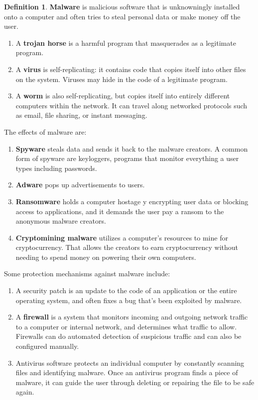 \documentclass[a4paper, 12pt]{report}
\theoremstyle{remark}
\theoremstyle{definition}
\newtheorem{definition}{Definition}[section]
\begin{document}
\begin{definition}
\textbf{Malware} is malicious software that is unknowningly installed onto a computer and often tries to steal personal data or make money off the user. 
\begin{enumerate}
    \item A \textbf{trojan horse} is a harmful program that masquerades as a legitimate program. 
    \item A \textbf{virus} is self-replicating: it contains code that copies itself into other files on the system. Viruses may hide in the code of a legitimate program. 
    \item A \textbf{worm} is also self-replicating, but copies itself into entirely different computers within the network. It can travel along networked protocols such as email, file sharing, or instant messaging. 
\end{enumerate}
The effects of malware are: 
\begin{enumerate}
    \item \textbf{Spyware} steals data and sends it back to the malware creators. A common form of spyware are keyloggers, programs that monitor everything a user types including passwords. 
    \item \textbf{Adware} pops up advertisements to users.
    \item \textbf{Ransomware} holds a computer hostage y encrypting user data or blocking access to applications, and it demands the user pay a ransom to the anonymous malware creators. 
    \item \textbf{Cryptomining malware} utilizes a computer's resources to mine for cryptocurrency. That allows the creators to earn cryptocurrency without needing to spend money on powering their own computers.
\end{enumerate}
\end{definition}

Some protection mechanisms against malware include: 
\begin{enumerate}
    \item A security patch is an update to the code of an application or the entire operating system, and often fixes a bug that's been exploited by malware. 
    \item A \textbf{firewall} is a system that monitors incoming and outgoing network traffic to a computer or internal network, and determines what traffic to allow. Firewalls can do automated detection of suspicious traffic and can also be configured manually. 
    \item Antivirus software protects an individual computer by constantly scanning files and identifying malware. Once an antivirus program finds a piece of malware, it can guide the user through deleting or repairing the file to be safe again. 
\end{enumerate}
\end{document}
